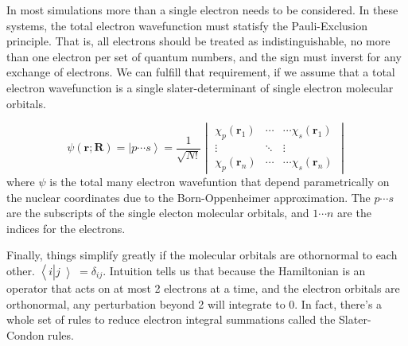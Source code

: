         In most simulations more than a single electron needs to be considered.
        In these systems, the total electron wavefunction must statisfy the Pauli-Exclusion principle.
        That is, all electrons should be treated as indistinguishable, no more than one electron per set of quantum numbers, and the sign must inverst for any exchange of electrons.
        We can fulfill that requirement, if we assume that a total electron wavefunction is a single slater-determinant of single electron molecular orbitals.

        \begin{equation} \label{eq:slater-determinant} \psi(\bm{r};\bm{R}) =
          \left|p \cdots s\right> = \frac{1}{\sqrt{N!}}
          \begin{vmatrix}
            \chi_{p}(\bm{r}_1) & \cdots & \cdots \chi_{s}(\bm{r}_1) \\
            \vdots             & \ddots         &       \vdots      \\
            \chi_{p}(\bm{r}_n) & \cdots & \cdots \chi_{s}(\bm{r}_n)
          \end{vmatrix}
        \end{equation}
        where \(\psi\) is the total many electron wavefuntion that depend parametrically on the nuclear coordinates due to the Born-Oppenheimer approximation.
        The $p \cdots s$ are the subscripts of the single electon molecular orbitals, and $1 \cdots n$ are the indices for the electrons.


        Finally, things simplify greatly if the molecular orbitals are
        othornormal to each other. $\left<\right.i\left|\right.j\left>\right. = \delta_{ij}$.
        Intuition tells us that because the Hamiltonian is an operator that
        acts on at most 2 electrons at a time, and the electron orbitals
        are orthonormal, any perturbation beyond 2 will integrate to 0.  In
        fact, there's a whole set of rules to reduce electron integral
        summations called the Slater-Condon rules.

